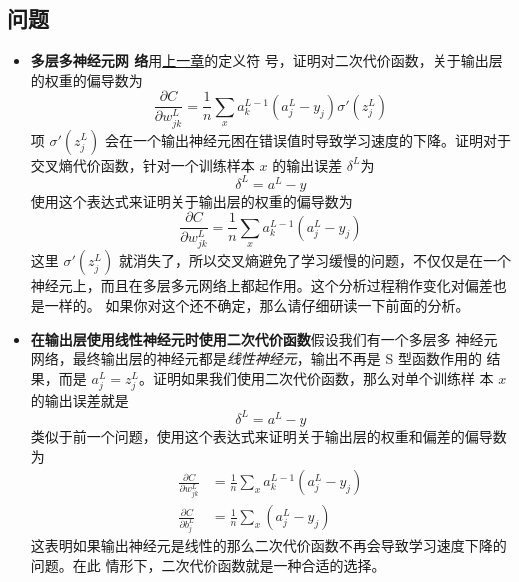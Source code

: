 \subsection*{问题}

\begin{itemize}
\item \textbf{多层多神经元网
    络}\quad 用\hyperref[ch:HowTheBackpropagationAlgorithmWorks]{上一章}的定义符
  号，证明对二次代价函数，关于输出层的权重的偏导数为
  \begin{equation}
    \frac{\partial C}{\partial w^L_{jk}} = \frac{1}{n}
    \sum_x a^{L-1}_k  (a^L_j-y_j) \sigma'(z^L_j)
    \label{eq:65}\tag{65}
  \end{equation}
  项 $\sigma'(z^L_j)$ 会在一个输出神经元困在错误值时导致学习速度的下降。证明对于
  交叉熵代价函数，针对一个训练样本 $x$ 的输出误差 $\delta^L$为
  \begin{equation} 
    \delta^L = a^L-y
    \label{eq:66}\tag{66}
  \end{equation}
  使用这个表达式来证明关于输出层的权重的偏导数为
  \begin{equation} 
    \frac{\partial C}{\partial w^L_{jk}} = \frac{1}{n} \sum_x 
    a^{L-1}_k  (a^L_j-y_j)
    \label{eq:67}\tag{67}
  \end{equation}
  这里 $\sigma'(z^L_j)$ 就消失了，所以交叉熵避免了学习缓慢的问题，不仅仅是在一个
  神经元上，而且在多层多元网络上都起作用。这个分析过程稍作变化对偏差也是一样的。
  如果你对这个还不确定，那么请仔细研读一下前面的分析。
\item \textbf{在输出层使用线性神经元时使用二次代价函数}\quad 假设我们有一个多层多
  神经元网络，最终输出层的神经元都是\emph{线性神经元}，输出不再是 S 型函数作用的
  结果，而是 $a^L_j = z^L_j$。证明如果我们使用二次代价函数，那么对单个训练样
  本 $x$ 的输出误差就是
  \begin{equation}
    \delta^L = a^L-y
    \label{eq:68}\tag{68}
  \end{equation}
  类似于前一个问题，使用这个表达式来证明关于输出层的权重和偏差的偏导数为
  \begin{align}
    \frac{\partial C}{\partial w^L_{jk}} &= \frac{1}{n} \sum_x 
                                           a^{L-1}_k  (a^L_j-y_j) \label{eq:69}\tag{69}\\
    \frac{\partial C}{\partial b^L_{j}} &= \frac{1}{n} \sum_x 
                                          (a^L_j-y_j) \label{eq:70}\tag{70}
  \end{align}
  这表明如果输出神经元是线性的那么二次代价函数不再会导致学习速度下降的问题。在此
  情形下，二次代价函数就是一种合适的选择。
\end{itemize}

